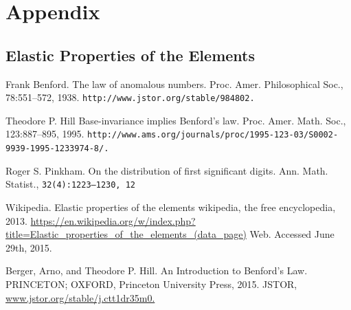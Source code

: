 \documentclass[12pt, titlepage]{article}
\begin{document}
\appendix
\section{Appendix}
\subsection{Elastic Properties of the Elements \cite{elements}}


\pagebreak

\begin{thebibliography}{9}
\raggedright
{} 
Frank Benford. The law of anomalous numbers. Proc. Amer. Philosophical Soc., 78:551–572, 1938. \texttt{http://www.jstor.org/stable/984802.}
 
Theodore P. Hill Base-invariance implies Benford’s law. Proc. Amer. Math. Soc., 123:887–895, 1995.
\texttt{http://www.ams.org/journals/proc/1995-123-03/S0002-9939-1995-1233974-8/.}
 
Roger S. Pinkham. On the distribution of first significant digits. Ann. Math. Statist., \texttt{32(4):1223–1230, 12}

Wikipedia. Elastic properties of the elements  wikipedia, the free encyclopedia, 2013. \url{https://en.wikipedia.org/w/index.php?title=Elastic_properties_of_the_elements_(data_page)} Web. Accessed June 29th, 2015.

Berger, Arno, and Theodore P. Hill. An Introduction to Benford's Law. PRINCETON; OXFORD, Princeton University Press, 2015. JSTOR, \url{www.jstor.org/stable/j.ctt1dr35m0.}

\end{thebibliography}





\end{document}
